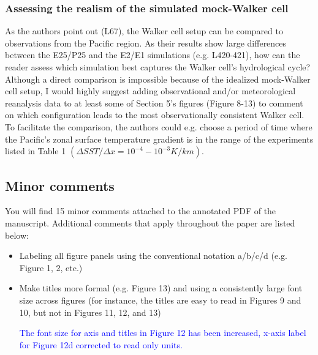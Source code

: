 \documentclass[draft]{agujournal2019}
\begin{document}
\subsubsection{Assessing the realism of the simulated mock-Walker cell}

As the authors point out (L67), the Walker cell setup can be compared to observations from the Pacific region. As their
results show large differences between the E25/P25 and the E2/E1 simulations (e.g. L420-421), how can the reader
assess which simulation best captures the Walker cell’s hydrological cycle?
Although a direct comparison is impossible because of the idealized mock-Walker cell setup, I would highly suggest
adding observational and/or meteorological reanalysis data to at least some of Section 5’s figures (Figure 8-13) to comment
on which configuration leads to the most observationally consistent Walker cell. To facilitate the comparison, the authors
could e.g. choose a period of time where the Pacific’s zonal surface temperature gradient is in the range of the experiments
listed in Table 1 $(\Delta SST/ \Delta x = 10^{-4} - 10^{-3} K/km).  $

\subsection{Minor comments}

You will find 15 minor comments attached to the annotated PDF of the manuscript. Additional comments that apply
throughout the paper are listed below:
\begin{itemize}
  \item Labeling all figure panels using the conventional notation a/b/c/d (e.g. Figure 1, 2, etc.)
  \item Make titles more formal (e.g. Figure 13) and using a consistently large font size across figures (for instance, the
titles are easy to read in Figures 9 and 10, but not in Figures 11, 12, and 13)

  \textcolor{blue}{The font size for axis and titles in Figure 12 has been increased, x-axis label for Figure 12d corrected to read only units.}
\end{itemize}







%
%


\end{document}
